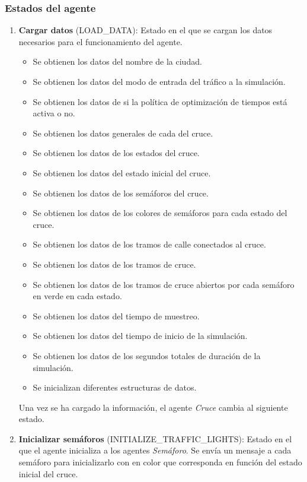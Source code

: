 \subsubsection{Estados del agente}
\begin{enumerate}
    \item \textbf{Cargar datos} \footnotesize(LOAD\_DATA)\normalsize: Estado en el que se cargan los datos necesarios para el funcionamiento del agente.
    \begin{itemize}
        \item Se obtienen los datos del nombre de la ciudad.
        \item Se obtienen los datos del modo de entrada del tráfico a la simulación.
        \item Se obtienen los datos de si la política de optimización de tiempos está activa o no.
        \item Se obtienen los datos generales de cada del cruce.
        \item Se obtienen los datos de los estados del cruce.
        \item Se obtienen los datos del estado inicial del cruce.
        \item Se obtienen los datos de los semáforos del cruce.
        \item Se obtienen los datos de los colores de semáforos para cada estado del cruce.
        \item Se obtienen los datos de los tramos de calle conectados al cruce.
        \item Se obtienen los datos de los tramos de cruce.
        \item Se obtienen los datos de los tramos de cruce abiertos por cada semáforo en verde en cada estado.
        \item Se obtienen los datos del tiempo de muestreo.
        \item Se obtienen los datos del tiempo de inicio de la simulación.
        \item Se obtienen los datos de los segundos totales de duración de la simulación.  \item Se inicializan diferentes estructuras de datos.
    \end{itemize}
    Una vez se ha cargado la información, el agente \textit{Cruce} cambia al siguiente estado.
    \item \textbf{Inicializar semáforos} \footnotesize(INITIALIZE\_TRAFFIC\_LIGHTS)\normalsize: Estado en el que el agente inicializa a los agentes \textit{Semáforo}. Se envía un mensaje a cada semáforo para inicializarlo con en color que corresponda en función del estado inicial del cruce.

\end{enumerate}
